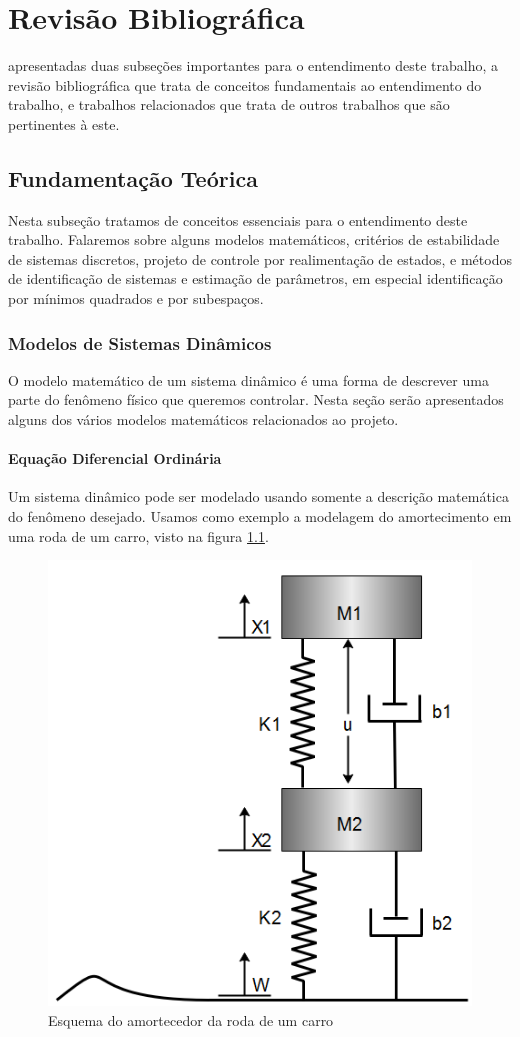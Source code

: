 \chapter{Revisão Bibliográfica} \label{cap2}

 apresentadas duas subseções importantes para o entendimento deste trabalho, a revisão bibliográfica que trata de conceitos fundamentais ao entendimento do trabalho, e trabalhos relacionados que trata de outros trabalhos que são pertinentes à este.
	
\section{Fundamentação Teórica}
Nesta subseção tratamos de conceitos essenciais para o entendimento deste trabalho. Falaremos sobre alguns modelos matemáticos, critérios de estabilidade de sistemas discretos, projeto de controle por realimentação de estados, e métodos de identificação de sistemas e estimação de parâmetros, em especial identificação por mínimos quadrados e por subespaços.


\subsection{Modelos de Sistemas Dinâmicos}\label{capA}
O modelo matemático de um sistema dinâmico é uma forma de descrever uma parte do fenômeno físico que queremos controlar. Nesta seção serão apresentados alguns dos vários modelos matemáticos relacionados ao projeto.
\subsubsection{Equação Diferencial Ordinária}
Um sistema dinâmico pode ser modelado usando somente a descrição matemática do fenômeno desejado. Usamos como exemplo a modelagem do amortecimento em uma roda de um carro, visto na figura \ref{fig:modeloamortecimento}.

\begin{figure}
	\centering
	\includegraphics[width=0.5\linewidth]{modelo_amortecimento}
	\caption{Esquema do amortecedor da roda de um carro}
	\label{fig:modeloamortecimento}
\end{figure}

